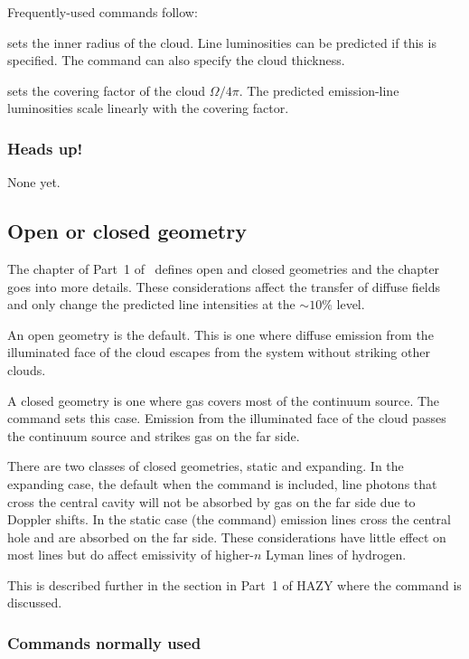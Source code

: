 \documentclass[12pt,twoside]{article}
\begin{document}
Frequently-used commands follow:

 sets the inner radius
of the cloud.  Line luminosities can be
predicted if this is specified.  The command can also specify the cloud
thickness.

 sets the covering factor of the cloud
$\Omega/4\pi$.  The
predicted emission-line luminosities scale linearly with the covering factor.

\subsubsection{Heads up!}

   None yet.

\subsection{Open or closed geometry}

   The chapter  of Part~1 of \Hazy\ defines open and closed
geometries and the chapter  goes into more details.  These
considerations affect the transfer of diffuse fields and only change the
predicted line intensities at the $\sim 10\%$ level.

   An open geometry is the default.  This is one where diffuse emission
from the illuminated face of the cloud escapes from the system without
striking other clouds.

   A closed geometry is one where gas covers most of the continuum source.
The  command sets this case.
Emission from the illuminated face of
the cloud passes the continuum source and strikes gas on the far side.

There are two classes of closed geometries, static and expanding.  In
the expanding case, the default when the  command is included,
line photons that cross the central cavity will not be absorbed
by gas on the far side due to Doppler shifts.  In the static case (the
 command) emission lines
cross the central hole and are absorbed on
the far side.  These considerations have little effect on most lines but
do affect emissivity of higher-$n$ Lyman lines of hydrogen.

This is described further in the section in Part~1 of HAZY where the
 command is discussed.

\subsubsection{Commands normally used}
\end{document}
